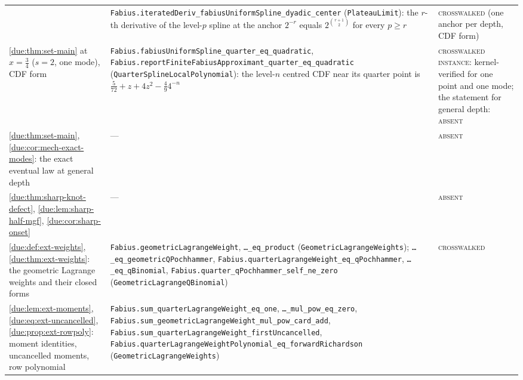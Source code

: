 \documentclass[11pt,oneside]{article}
\theoremstyle{plain}
\theoremstyle{definition}
\theoremstyle{remark}
\begin{document}
\begin{center}
\begin{longtable}{@{}>{\raggedright\arraybackslash}p{}>{\raggedright\arraybackslash}p{}>{\raggedright\arraybackslash}p{}@{}}
& \texttt{Fabius.\allowbreak iteratedDeriv\_\allowbreak fabiusUniformSpline\_\allowbreak dyadic\_\allowbreak center} (\texttt{PlateauLimit}): the $r$-th derivative of the level-$p$ spline at the anchor $2^{-r}$ equals $2^{\binom{r+1}{2}}$ for every $p\ge r$
& \textsc{crosswalked} (one anchor per depth, CDF form)\\[0.3em]
\cref{due:thm:set-main} at $x=\tfrac34$ ($s=2$, one mode), CDF form
& \texttt{Fabius.\allowbreak fabiusUniformSpline\_\allowbreak quarter\_\allowbreak eq\_\allowbreak quadratic}, \texttt{Fabius.\allowbreak reportFiniteFabiusApproximant\_\allowbreak quarter\_\allowbreak eq\_\allowbreak quadratic} (\texttt{QuarterSplineLocalPolynomial}): the level-$n$ centred CDF near its quarter point is $\tfrac5{72}+z+4z^{2}-\tfrac49 4^{-n}$
& \textsc{crosswalked instance}: kernel-verified for one point and one mode; the statement for general depth: \textsc{absent}\\[0.3em]
\cref{due:thm:set-main}, \cref{due:cor:mech-exact-modes}: the exact eventual law at general depth
& --- & \textsc{absent}\\[0.3em]
\cref{due:thm:sharp-knot-defect}, \cref{due:lem:sharp-half-mgf}, \cref{due:cor:sharp-onset}
& --- & \textsc{absent}\\[0.3em]
\cref{due:def:ext-weights}, \cref{due:thm:ext-weights}: the geometric Lagrange weights and their closed forms
& \texttt{Fabius.\allowbreak geometricLagrangeWeight}, \texttt{\ldots\_eq\_product} (\texttt{GeometricLagrangeWeights}); \texttt{\ldots\_\allowbreak eq\_\allowbreak geometricQPochhammer}, \texttt{Fabius.\allowbreak quarterLagrangeWeight\_\allowbreak eq\_\allowbreak qPochhammer}, \texttt{\ldots\_eq\_qBinomial}, \texttt{Fabius.\allowbreak quarter\_\allowbreak qPochhammer\_\allowbreak self\_\allowbreak ne\_\allowbreak zero} (\texttt{GeometricLagrangeQBinomial})
& \textsc{crosswalked}\\[0.3em]
\cref{due:lem:ext-moments}, \cref{due:eq:ext-uncancelled}, \cref{due:prop:ext-rowpoly}: moment identities, uncancelled moments, row polynomial
& \texttt{Fabius.\allowbreak sum\_\allowbreak quarterLagrangeWeight\_\allowbreak eq\_\allowbreak one}, \texttt{\ldots\_mul\_pow\_eq\_zero}, \texttt{Fabius.\allowbreak sum\_\allowbreak geometricLagrangeWeight\_\allowbreak mul\_\allowbreak pow\_\allowbreak card\_\allowbreak add}, \texttt{Fabius.\allowbreak sum\_\allowbreak quarterLagrangeWeight\_\allowbreak firstUncancelled}, \texttt{Fabius.\allowbreak quarterLagrangeWeightPolynomial\_\allowbreak eq\_\allowbreak forwardRichardson} (\texttt{GeometricLagrangeWeights})

\end{longtable}
\end{center}
\end{document}
